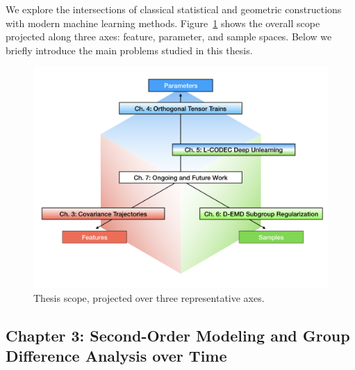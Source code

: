 We explore the intersections of classical statistical and geometric constructions with modern machine learning methods. 
Figure~\ref{fig:scope} shows the overall scope projected along three axes: feature, parameter, and sample spaces.
Below we briefly introduce the main problems studied in this thesis.
\begin{figure}[ht]
    \centering
    \includegraphics[width=0.95\linewidth]{1_intro/thesis_scope_diss/thesis_scope_diss.png}
    \vspace{-10pt}
    \caption[Thesis scope]{Thesis scope, projected over three representative axes.}
    \label{fig:scope}
\end{figure}

\subsection{Chapter 3: Second-Order Modeling and Group Difference Analysis over Time}

